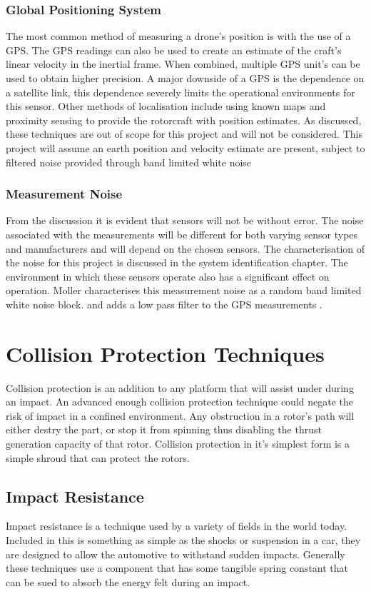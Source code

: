 		\subsubsection{Global Positioning System}
		The most common method of measuring a drone's position is with the use of a GPS. The GPS readings can also be used to create an estimate of the craft's linear velocity in the inertial frame. When combined, multiple GPS unit's can be used to obtain higher precision. A major downside of a GPS is the dependence on a satellite link, this dependence severely limits the operational environments for this sensor. Other methods of localisation include using known maps and proximity sensing to provide the rotorcraft with position estimates. As discussed, these techniques are out of scope for this project and will not be considered. This project will assume an earth position and velocity estimate are present, subject to filtered noise provided through band limited white noise \cite{Moller2015}
		
		\subsubsection{Measurement Noise}
		From the discussion it is evident that sensors will not be without error. The noise associated with the measurements will be different for both varying sensor types and manufacturers and will depend on the chosen sensors. The characterisation of the noise for this project is discussed in the system identification chapter. The environment in which these sensors operate also has a significant effect on operation. Moller characterises this measurement noise as a random band limited white noise block. and adds a low pass filter to the GPS measurements \cite{Moller2015}.

\section{Collision Protection Techniques}
	Collision protection is an addition to any platform that will assist under during an impact. An advanced enough collision protection technique could negate the risk of impact in a confined environment. Any obstruction in a rotor's path will either destry the part, or stop it from spinning thus disabling the thrust generation capacity of that rotor. Collision protection in it's simplest form is a simple shroud that can protect the rotors. 
	
	\subsection{Impact Resistance}
	Impact resistance is a technique used by a variety of fields in the world today. Included in this is something as simple as the shocks or suspension in a car, they are designed to allow the automotive to withstand sudden impacts. Generally these techniques use a component that has some tangible spring constant that can be sued to absorb the energy felt during an impact.
	
